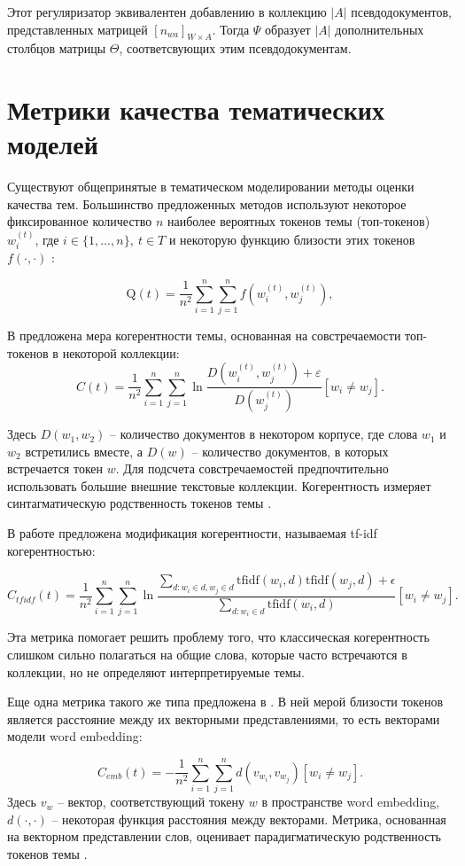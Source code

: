 Этот регуляризатор эквивалентен добавлению в коллекцию $|A|$ псевдодокументов, представленных матрицей $[n_{wa}]_{W\times A}$. Тогда $\Psi$ образует $|A|$ дополнительных столбцов матрицы $\Theta$, соответсвующих этим псевдодокументам.

\section{Метрики качества тематических моделей}
Существуют общепринятые в тематическом моделировании методы оценки качества тем. Большинство предложенных методов используют некоторое фиксированное количество $n$ наиболее вероятных токенов темы (топ-токенов) $w_i^{(t)}$, где $i \in \{1,...,n\}, \ t \in T$ и некоторую функцию близости этих токенов $f(\cdot, \cdot)$ : 

$$\mathrm{Q}(t) = \dfrac{1}{n^2}\sum\limits_{i=1}^n\sum\limits_{j=1}^n f(w_i^{(t)}, w_j^{(t)}),$$

В \cite{Mimno2011} предложена мера когерентности темы, основанная на совстречаемости топ-токенов в некоторой коллекции:
$$C(t) = \dfrac{1}{n^2}\sum\limits_{i=1}^n \sum\limits_{j=1}^n \ln \dfrac{D(w^{(t)}_i, w^{(t)}_j) + \varepsilon}{D(w^{(t)}_j)}[w_i \neq w_j].$$ 

Здесь $D(w_1, w_2)$ -- количество документов в некотором корпусе, где слова $w_1$ и $w_2$ встретились вместе, а $D(w)$ -- количество документов, в которых встречается токен $w$. Для подсчета совстречаемостей предпочтительно использовать большие внешние текстовые коллекции. Когерентность измеряет синтагматическую родственность токенов темы \cite{Schutze1993}.

В работе \cite{Nikolenko2017} предложена модификация когерентности, называемая tf-idf когерентностью:

 $$C_{tfidf}(t) = \dfrac{1}{n^2}\sum\limits_{i=1}^n \sum\limits_{j=1}^n \ln{\frac{\sum\limits_{d: w_i \in d, w_j \in d} \mathrm{tfidf}(w_i, d)\mathrm{tfidf}(w_j, d) + \epsilon}{\sum\limits_{d: w_i \in d}\mathrm{tfidf}(w_i, d)}}[w_i \neq w_j].$$


Эта метрика помогает решить проблему того, что классическая когерентность
слишком сильно полагаться на общие слова, которые часто встречаются в коллекции,
но не определяют интерпретируемые темы.

Еще одна метрика такого же типа предложена в \cite{Nikolenko2016}. В ней мерой близости токенов является расстояние между их векторными представлениями, то есть векторами модели word embedding:

$$C_{emb}(t) = -\dfrac{1}{n^2}\sum\limits_{i=1}^n \sum\limits_{j=1}^n d( v_{w_i}, v_{w_j})[w_i \neq w_j].$$
Здесь $v_{w}$ -- вектор, соответствующий токену $w$ в пространстве word embedding, $d(\cdot, \cdot)$ -- некоторая функция расстояния между векторами. Метрика, основанная на векторном представлении слов, оценивает парадигматическую родственность токенов темы \cite{Schutze1993}.

